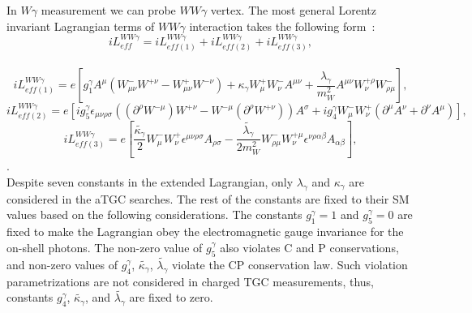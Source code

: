 In $W\gamma$ measurement we can probe $WW\gamma$ vertex. The most general Lorentz invariant Lagrangian terms of $WW\gamma$ interaction takes the following form~\cite{ref_theory_aTGC}:\\
\begin{equation}\label{L_ATGC}
i L_{eff}^{WW\gamma}= i L_{eff(1)}^{WW\gamma} + i L_{eff(2)}^{WW\gamma} + i L_{eff(3)}^{WW\gamma},
\end{equation}
\\
\begin{equation}\label{L_ATGC_1}
i L_{eff(1)}^{WW\gamma}= e [ g_1^{\gamma} A^\mu (W_{\mu\nu}^- W^{+\nu} - W_{\mu\nu}^+ W^{-\nu}) + \kappa_\gamma W_{\mu}^+ W_{\nu}^- A^{\mu\nu} + {\frac{\lambda_\gamma}{m^2_W}} A^{\mu\nu} W_\nu^{+\rho} W_{\rho\mu}^- ],
\end{equation}
\begin{equation}\label{L_ATGC_2}
i L_{eff(2)}^{WW\gamma}= e [ i g_5^\gamma \epsilon_{\mu\nu\rho\sigma}((\partial^\rho W^{-\mu})W^{+\nu} - W^{-\mu}(\partial^{\rho}W^{+\nu}))A^\sigma + i g_4^\gamma W_\mu^- W_\nu^+ (\partial^\mu A^\nu + \partial^\nu A^\mu) ],
\end{equation}
\begin{equation}\label{L_ATGC_3}
i L_{eff(3)}^{WW\gamma}= e [ \frac{\tilde{\kappa_\gamma}}{2} W_\mu^- W_\nu^+ \epsilon^{\mu\nu\rho\sigma} A_{\rho\sigma} - \frac{\tilde{\lambda_\gamma}}{2 m_W^2} W_{\rho\mu}^- W^{+\mu}_{\nu} \epsilon^{\nu\rho\alpha\beta} A_{\alpha\beta}],
\end{equation}
.\\
Despite seven constants in the extended Lagrangian, only $\lambda_\gamma$ and $\kappa_\gamma$ are considered in the aTGC searches. The rest of the constants are fixed to their SM values based on the following considerations. The constants $g_1^\gamma=1$ and $g_5^\gamma=0$ are fixed to make the Lagrangian obey the electromagnetic gauge invariance for the on-shell photons. The non-zero value of $g_5^\gamma$ also violates C and P conservations, and non-zero values of $g_4^\gamma$, $\tilde{\kappa_\gamma}$, $\tilde{\lambda_\gamma}$ violate the CP conservation law. Such violation parametrizations are not considered in charged TGC measurements, thus, constants $g_4^\gamma$, $\tilde{\kappa_\gamma}$, and $\tilde{\lambda_\gamma}$ are fixed to zero.\\
